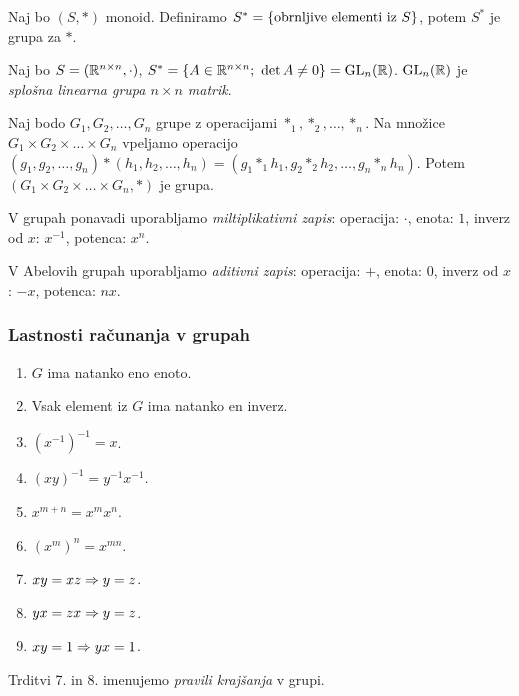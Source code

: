 \begin{zgled}
    Naj bo $(S, *)$ monoid. Definiramo $S^* = \left\{\text{obrnljive elementi iz } S\right\}$, potem $S^*$ je grupa za $*$.
\end{zgled}

\begin{primer}
    Naj bo $S = (\mathbb{R}^{n \times n}, \cdot)$, $S^* = \left\{A \in \mathbb{R}^{n \times n}; \ \det A \neq 0\right\} = \operatorname{GL}_n(\mathbb{R})$. $\operatorname{GL}_n(\mathbb{R})$ je \emph{splošna linearna grupa $n \times n$ matrik}.
\end{primer}

\begin{zgled}
    Naj bodo $G_1, G_2, \ldots, G_n$ grupe z operacijami $*_1, *_2, \ldots, *_n$. Na množice $G_1 \times G_2 \times \ldots \times G_n$ vpeljamo operacijo $(g_1, g_2, \ldots, g_n) * (h_1, h_2, \ldots, h_n) = (g_1 *_1 h_1, g_2 *_2 h_2, \ldots, g_n *_n h_n)$. Potem $(G_1 \times G_2 \times \ldots \times G_n, *)$ je grupa. 
\end{zgled}

V grupah ponavadi uporabljamo \emph{miltiplikativni zapis}: operacija: $\cdot$, enota: $1$, inverz od $x$: $x^{-1}$, potenca: $x^n$.

V Abelovih grupah uporabljamo \emph{aditivni zapis}: operacija: $+$, enota: $0$, inverz od $x$: $-x$, potenca: $nx$.

\subsubsection*{Lastnosti računanja v grupah}
\begin{enumerate}
    \item $G$ ima natanko eno enoto.
    \item Vsak element iz $G$ ima natanko en inverz.
    \item $(x^{-1})^{-1} = x$.
    \item $(xy)^{-1} = y^{-1}x^{-1}$.
    \item $x^{m+n} = x^mx^n$.
    \item $(x^m)^n = x^{mn}$.
    \item $xy=xz \Rightarrow y=z$.
    \item $yx=zx \Rightarrow y=z$.
    \item $xy=1 \Rightarrow yx =1$.
\end{enumerate}
Trditvi 7. in 8. imenujemo \emph{pravili krajšanja} v grupi.